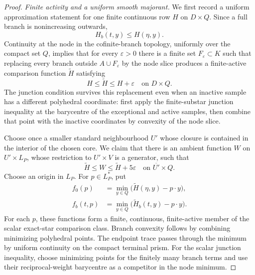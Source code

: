 \begin{proof}
\medskip\noindent
\emph{Finite activity and a uniform smooth majorant.}
We first record a uniform approximation statement for one finite continuous
row \(H\) on \(D\times Q\).  Since a full branch is nonincreasing outwards,
\[
                         H_b(t,y)\leq H(\eta,y).
\]
Continuity at the node in the cofinite-branch topology, uniformly over the
compact set \(Q\), implies that for every \(\varepsilon>0\) there is a finite
set \(F_\varepsilon\subset K\) such that replacing every branch outside
\(A\cup F_\varepsilon\) by the node slice produces a finite-active comparison
function \(\widetilde H\) satisfying
\begin{equation}
                 H\leq\widetilde H\leq H+\varepsilon
                 \quad\text{on }D\times Q.
 \label{eq:p071-infinite-polyhedral-finite-activity-error}
\end{equation}
The junction condition survives this replacement even when an inactive
sample has a different polyhedral coordinate: first apply the finite-substar
junction inequality at the barycentre of the exceptional and active
samples, then combine that point with the inactive coordinates by convexity
of the node slice.

Choose once a smaller standard neighbourhood \(U'\) whose closure is
contained in the interior of the chosen core.  We claim that there is an
ambient function \(W\) on \(U'\times L_P\), whose restriction to
\(U'\times V\) is a generator, such that
\begin{equation}
               \widetilde H\leq W\leq\widetilde H+5\varepsilon
               \quad\text{on }\overline{U'}\times Q.
 \label{eq:p071-infinite-polyhedral-smooth-majorant}
\end{equation}
Choose an origin in \(L_P\).  For \(p\in L_P^*\), put
\begin{align}
 f_0(p)&=\min_{y\in Q}
       \bigl(\widetilde H(\eta,y)-p\mathbin\cdot y\bigr),\\
 f_b(t,p)&=\min_{y\in Q}
       \bigl(\widetilde H_b(t,y)-p\mathbin\cdot y\bigr).
 \label{eq:p071-infinite-polyhedral-scalar-profiles}
\end{align}
For each \(p\), these functions form a finite, continuous, finite-active
member of the scalar exact-star comparison class.  Branch convexity follows
by combining minimizing polyhedral points.  The endpoint trace passes
through the minimum by uniform continuity on the compact terminal prism.
For the scalar junction inequality, choose minimizing points for the finitely
many branch terms and use their reciprocal-weight barycentre as a competitor
in the node minimum.


\end{proof}
